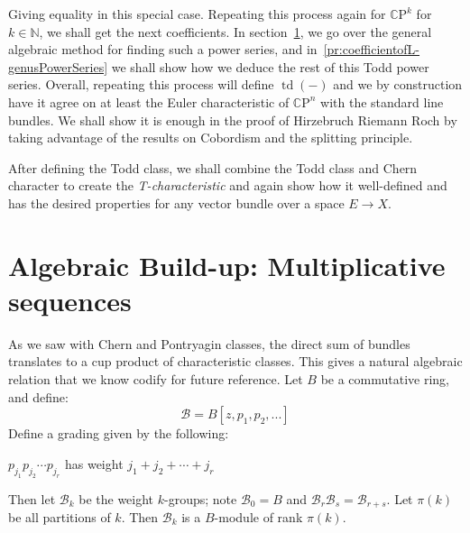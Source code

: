 \documentclass{book}
\newcommand{\N}{{\mathbb{N}}}
\newcommand{\Z}{{\mathbb{Z}}}
\newcommand{\cp}{{\mathpzc{p}}}
\newcommand{\CB}{{\mathcal{B}}}
\newcommand{\CP}{\mathbb{C}\mathrm{P}}
\newcommand{\td}{{\operatorname{td}}}
\begin{document}
Giving equality in this special case. Repeating this process again for $\CP^k$ for $k \in \N$, we shall get
the next coefficients. In section~\ref{sec:mSequence}, we go over the general algebraic method for finding
such a power series, and in~\cref{pr:coefficientofL-genusPowerSeries} we shall show how we deduce the rest of
this Todd power series. Overall, repeating this process will define $\td(-)$ and we by construction have it agree on
at least the Euler characteristic of $\CP^n$ with the standard line bundles. We shall show it is enough in the
proof of Hirzebruch Riemann Roch by taking advantage of the results on Cobordism and the splitting principle.

After defining the Todd class, we shall combine the Todd class and Chern character to create the
\emph{T-characteristic} and again show how it well-defined and has the desired properties for any vector
bundle over a space $E \to X$.


%

\section{Algebraic Build-up: Multiplicative sequences}\label{sec:mSequence}

As we saw with Chern and Pontryagin classes, the direct sum of bundles translates to a cup product of
characteristic classes. This gives a natural algebraic relation that we know codify for future reference. Let
$B$ be a commutative ring, and define:
\[
  \CB = B[z, p_1, p_2, ...]
\]
Define a grading given by the following:
\begin{center}
  $p_{j_1}p_{j_2}\cdots p_{j_r}$ has weight $j_1 + j_2 + \cdots + j_r$
\end{center}
Then let $\CB_k$ be the weight $k$-groups; note $\CB_0 = B$ and $\CB_r\CB_s = \CB_{r+s}$. Let $\pi(k)$ be all
partitions of $k$. Then $\CB_k$ is a $B$-module of rank $\pi(k)$.
\end{document}

